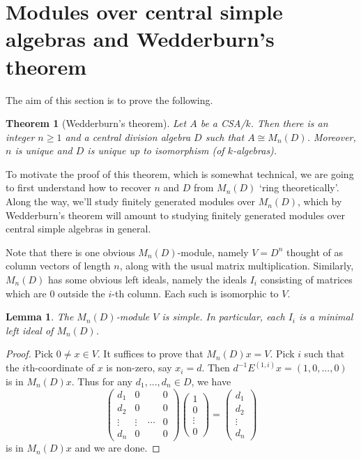 \documentclass[11pt]{amsart}
\numberwithin{equation}{section}
\newtheorem{theorem}[equation]{Theorem}
\newtheorem{lemma}[equation]{Lemma}
\theoremstyle{remark}
\theoremstyle{remark}
\theoremstyle{remark}
\theoremstyle{definition}
\theoremstyle{definition}
\theoremstyle{definition}
\theoremstyle{definition}
\theoremstyle{definition}
\theoremstyle{definition}
\begin{document}
\section{Modules over central simple algebras and Wedderburn's theorem}

The aim of this section is to prove the following.

\begin{theorem}[Wedderburn's theorem]
Let $A$ be a CSA/$k$. Then there is an integer $n\geq 1$ and a central division algebra $D$ such that $A\cong M_n(D)$. Moreover, $n$ is unique and $D$ is unique up to isomorphism (of $k$-algebras). 
\end{theorem}

To motivate the proof of this theorem, which is somewhat technical, we are going to first understand how to recover $n$ and $D$ from $M_n(D)$ `ring theoretically'. Along the way, we'll study finitely generated modules over $M_n(D)$, which by Wedderburn's theorem will amount to studying finitely generated modules over central simple algebras in general. 

Note that there is one obvious $M_n(D)$-module, namely $V=D^n$ thought of as column vectors of length $n$, along with the usual matrix multiplication. Similarly, $M_n(D)$ has some obvious left ideals, namely the ideals $I_i$ consisting of matrices which are $0$ outside the $i$-th column. Each such is isomorphic to $V$. 

\begin{lemma} \label{dn is simple}
The $M_n(D)$-module $V$ is simple. In particular, each $I_i$ is a minimal left ideal of $M_n(D)$. 
\end{lemma}

\begin{proof}
Pick $0\neq x \in V$. It suffices to prove that $M_n(D)x=V$. Pick $i$ such that the $i$th-coordinate of $x$ is non-zero, say $x_i=d$. Then $d^{-1}E^{(1,i)}x=(1,0,...,0)$ is in $M_n(D)x$. Thus for any $d_1,...,d_n\in D$, we have
\[\left(\begin{array}{cccc}
d_1 & 0&&0\\
d_2 & 0&&0\\
\vdots & \vdots&\cdots&0\\
d_n &0&&0
\end{array}\right) \left(\begin{array}{c}1\\0\\\vdots\\0\end{array}\right)=\left(\begin{array}{c}d_1\\d_2\\\vdots\\d_n\end{array}\right)\]
is in $M_n(D)x$ and we are done.
\end{proof}
\end{document}
